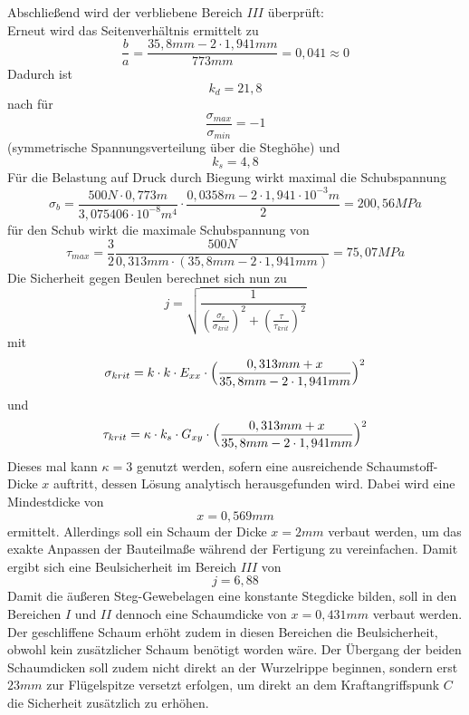 \noindent Abschließend wird der verbliebene Bereich $III$ überprüft:\\
\noindent Erneut wird das Seitenverhältnis ermittelt zu 
\begin{equation}
	\frac{b}{a}=\frac{35,8mm - 2\cdot 1,941mm}{773mm}=0,041\approx 0
\end{equation}
Dadurch ist
\begin{equation}
	k_{d}=21,8
\end{equation}
nach \cite{item1} für 
\begin{equation}
	\frac{\sigma_{max}}{\sigma_{min}}=-1
\end{equation} 
(symmetrische Spannungsverteilung über die Steghöhe) und
\begin{equation}
	k_{s} = 4,8
\end{equation}
Für die Belastung auf Druck durch Biegung wirkt maximal die Schubspannung
\begin{equation}
	\sigma_{b} = \frac{500N\cdot 0,773m}{3,075406\cdot 10^{-8}m^{4}}\cdot\frac{0,0358m - 2\cdot 1,941\cdot 10^{-3}m}{2}=200,56 MPa
\end{equation}
für den Schub wirkt die maximale Schubspannung von
\begin{equation}
	\tau_{max}=\frac{3}{2}\frac{500N}{0,313mm\cdot(35,8mm-2\cdot 1,941mm)}=75,07MPa
\end{equation}
Die Sicherheit gegen Beulen berechnet sich nun zu 
\begin{equation}
	j=\sqrt{\frac{1}{(\frac{\sigma_{v}}{\sigma_{krit}})^{2}+(\frac{\tau}{\tau_{krit}})^{2}}}
\end{equation}
mit 
\begin{equation}
	\sigma_{krit}=k\cdot k\cdot E_{xx}\cdot \Bigl(\frac{0,313mm+x}{35,8mm -2\cdot 1,941mm}\Bigr)^{2}
\end{equation}
und
\begin{equation}
	\tau_{krit} = \kappa\cdot k_{s}\cdot G_{xy}\cdot\Bigl(\frac{0,313mm + x}{35,8mm -2\cdot 1,941mm}\Bigr)^{2}
\end{equation}
Dieses mal kann $\kappa=3$ genutzt werden, sofern eine ausreichende Schaumstoff-Dicke $x$ auftritt, dessen Lösung analytisch herausgefunden wird. Dabei wird eine Mindestdicke von 
\begin{equation}
	x=0,569mm
\end{equation}
ermittelt. Allerdings soll ein Schaum der Dicke $x=2mm$ verbaut werden, um das exakte Anpassen der Bauteilmaße während der Fertigung zu vereinfachen. Damit ergibt sich eine Beulsicherheit im Bereich $III$ von
\begin{equation}
	j=6,88
\end{equation}
Damit die äußeren Steg-Gewebelagen eine konstante Stegdicke bilden, soll in den Bereichen $I$ und $II$ dennoch eine Schaumdicke von $x=0,431mm$ verbaut werden. Der geschliffene Schaum erhöht zudem in diesen Bereichen die Beulsicherheit, obwohl kein zusätzlicher Schaum benötigt worden wäre. Der Übergang der beiden Schaumdicken soll zudem nicht direkt an der Wurzelrippe beginnen, sondern erst $23mm$ zur Flügelspitze versetzt erfolgen, um direkt an dem Kraftangriffspunk $C$ die Sicherheit zusätzlich zu erhöhen.
